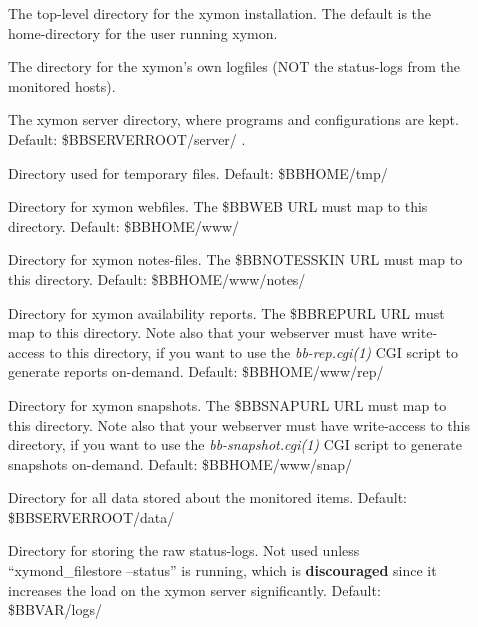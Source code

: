 \begin{description}

\item[] The top-level directory for the xymon
  installation. The default is the home-directory for the user running
  xymon. 


 

\item[] The directory for the xymon's own logfiles (NOT
  the status-logs from the monitored hosts). 


 

\item[] The xymon server directory, where programs and
  configurations are kept. Default: \$BBSERVERROOT/server/ . 


\item[] Directory used for temporary files. Default: \$BBHOME/tmp/ 

 
\item[] Directory for xymon webfiles. The \$BBWEB URL must map
  to this directory. Default: \$BBHOME/www/ 


\item[] Directory for xymon notes-files. The \$BBNOTESSKIN URL
  must map to this directory. Default: \$BBHOME/www/notes/ 



\item[] Directory for xymon availability reports. The \$BBREPURL
  URL must map to this directory. Note also that your webserver must
  have write-access to this directory, if you want to use the
  \emph{bb-rep.cgi(1)} CGI script to generate reports
  on-demand. Default: \$BBHOME/www/rep/ 


 

\item[] Directory for xymon snapshots. The \$BBSNAPURL URL must
  map to this directory. Note also that your webserver must have
  write-access to this directory, if you want to use the
  \emph{bb-snapshot.cgi(1)} CGI script to generate snapshots
  on-demand. Default: \$BBHOME/www/snap/ 


 

\item[] Directory for all data stored about the monitored items. Default: \$BBSERVERROOT/data/ 

 

\item[] Directory for storing the raw status-logs. Not used
  unless ``xymond\_filestore --status'' is running, which is
  \textbf{discouraged} since it increases the load on the xymon
  server significantly. Default: \$BBVAR/logs/ 



\end{description}
